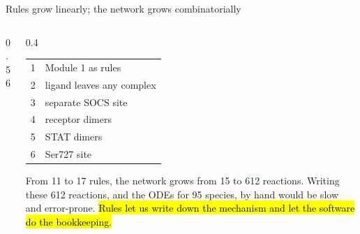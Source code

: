 \documentclass[aspectratio=169,10pt,t]{beamer}
\begin{document}
\begin{frame}{Rules grow linearly; the network grows combinatorially}
  \begin{columns}[c]
    \begin{column}{0.56\textwidth}
    \end{column}
    \begin{column}{0.4\textwidth}
      \small
      \begin{tabular}{@{}rl@{}}
        1 & Module 1 as rules \\
        2 & ligand leaves any complex \\
        3 & separate SOCS site \\
        4 & receptor dimers \\
        5 & STAT dimers \\
        6 & Ser727 site \\
      \end{tabular}
      \vskip3mm
      From 11 to 17 rules, the network grows from 15 to 612 reactions.
      \vskip2mm
      Writing these 612 reactions, and the ODEs for 95 species, by hand would be
      slow and error-prone. \hl{Rules let us write down the mechanism and let the
      software do the bookkeeping.}
    \end{column}
  \end{columns}
\end{frame}
\end{document}
